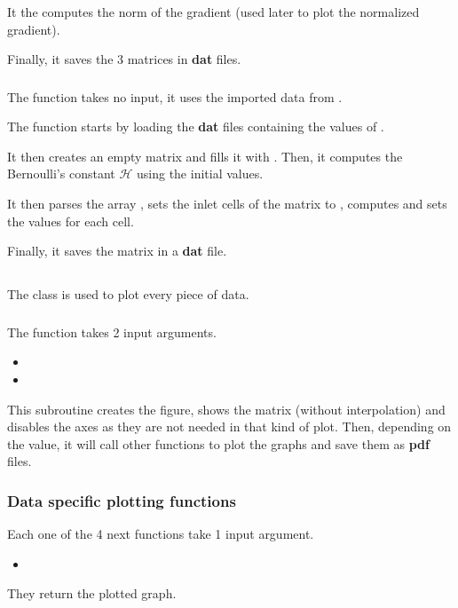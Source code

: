 It the computes the norm of the gradient (used later to plot the normalized
gradient).

Finally, it saves the 3 matrices in \textbf{dat} files.

\subsubsection{\textcolor{func}{}}
The function  takes no input, it uses the imported data
from .

The function starts by loading the \textbf{dat} files containing the values of
.

It then creates an empty matrix  and fills it with .
Then, it computes the Bernoulli's constant $\mathcal{H}$ using the initial
values.

It then parses the array , sets the inlet cells of the
 matrix to , computes and sets the values for
each cell.

Finally, it saves the matrix in a \textbf{dat} file.

\subsection{}
The class is used to plot every piece of data.

\subsubsection{\textcolor{func}{}}
The function  takes 2 input arguments.
\begin{itemize}
      \item {}
      \item {}
\end{itemize}
This subroutine creates the figure, shows the matrix  (without
interpolation) and disables the axes as they are not needed in that kind of
plot. Then, depending on the  value, it will call other 
functions to plot the graphs and save them as \textbf{pdf} files.

\subsubsection{Data specific plotting functions}
Each one of the 4 next functions take 1 input argument.
\begin{itemize}
      \item {}
\end{itemize}
They return the plotted graph.

